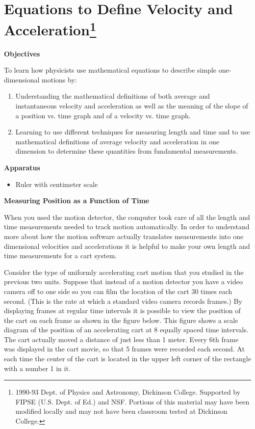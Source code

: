 
\section{Equations to Define Velocity and Acceleration\footnote{
1990-93 Dept. of Physics and Astronomy, Dickinson College. Supported by FIPSE
(U.S. Dept. of Ed.) and NSF. Portions of this material may have been modified
locally and may not have been classroom tested at Dickinson College.
}}

\makelabheader %

\textbf{Objectives} 

To learn how physicists use mathematical equations to describe simple one-dimensional
motions by:

\begin{enumerate}
\item Understanding the mathematical definitions of both average and instantaneous
velocity and acceleration as well as the meaning of the slope of a position
vs. time graph and of a velocity vs. time graph.
\item Learning to use different techniques for measuring length and time and to use
mathematical definitions of average velocity and acceleration in one dimension
to determine these quantities from fundamental measurements.
\end{enumerate}
\textbf{Apparatus} 

\begin{itemize}
\item Ruler with centimeter scale
\end{itemize}
\textbf{Measuring Position as a Function of Time} 

When you used the motion detector, the computer took care of all the length
and time measurements needed to track motion automatically. In order to understand
more about how the motion software actually translates measurements into one
dimensional velocities and accelerations it is helpful to make your own length
and time measurements for a cart system.

Consider the type of uniformly accelerating cart motion that you studied in
the previous two units. Suppose that instead of a motion detector you have a
video camera off to one side so you can film the location of the cart 30 times
each second. (This is the rate at which a standard video camera records frames.)
By displaying frames at regular time intervals it is possible to view the position
of the cart on each frame as shown in the figure below. This figure shows a
scale diagram of the position of an accelerating cart at 8 equally spaced time
intervals. The cart actually moved a distance of just less than 1 meter. Every
6th frame was displayed in the cart movie, so that 5 frames were recorded each
second. At each time the center of the cart is located in the upper left corner
of the rectangle with a number 1 in it. 

